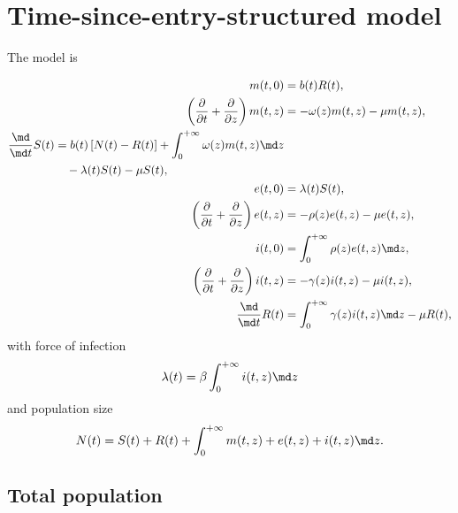 \documentclass{jpmarticle}
\let\subequationsorig\subequations%
\let\endsubequationsorig\endsubequations%
\renewenvironment{subequations}{
  \subequationsorig
  \renewcommand{\theequation}{\theparentequation.\arabic{equation}}
}{
  \endsubequationsorig
}
\begin{document}
\section{Time-since-entry-structured model}

The model is
\begin{subequations}
  \label{model_time_since_entry_structured}
  \begin{align}
    m(t, 0) &=
    b(t) R(t),
    \\
    \left(\frac{\partial}{\partial t}
      + \frac{\partial}{\partial z}\right)
    m(t, z) &=
    - \omega(z) m(t, z) - \mu m(t, z),
    \\
    \begin{split}
      \frac{\md}{\md t} S(t) &=
      b(t) \left[N(t) - R(t)\right]
      + \int_0^{+\infty} \omega(z) m(t, z) \md z
      \\ & \quad {}
      - \lambda(t) S(t) - \mu S(t),
    \end{split}
    \\
    e(t, 0) &=
    \lambda(t) S(t),
    \\
    \left(\frac{\partial}{\partial t}
      + \frac{\partial}{\partial z}\right)
    e(t, z) &=
    - \rho(z) e(t, z) - \mu e(t, z),
    \\
    i(t, 0) &=
    \int_0^{+\infty} \rho(z) e(t, z) \md z,
    \\
    \left(\frac{\partial}{\partial t}
      + \frac{\partial}{\partial z}\right)
    i(t, z) &=
    - \gamma(z) i(t, z) - \mu i(t, z),
    \\
    \frac{\md}{\md t} R(t) &=
    \int_0^{+\infty} \gamma(z) i(t, z) \md z
    - \mu R(t),
  \end{align}
  with force of infection
  \begin{equation}
    \lambda(t) = \beta \int_0^{+\infty} i(t, z) \md z
  \end{equation}
  and population size
  \begin{equation}
    N(t) =
    S(t) + R(t)
    + \int_0^{+\infty} m(t, z) + e(t, z) + i(t, z) \md z.
  \end{equation}
\end{subequations}


\subsection{Total population}
\end{document}
